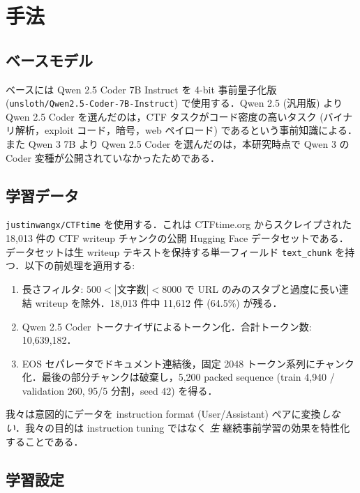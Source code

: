 \documentclass[10pt,twocolumn,a4paper]{ltjsarticle}
\begin{document}
\section{手法}

\subsection{ベースモデル}

ベースには Qwen 2.5 Coder 7B Instruct \cite{hui2024qwen25coder} を 4-bit 事前量子化版 (\texttt{unsloth/Qwen2.5-Coder-7B-Instruct}) で使用する．Qwen 2.5 (汎用版) より Qwen 2.5 Coder を選んだのは，CTF タスクがコード密度の高いタスク (バイナリ解析，exploit コード，暗号，web ペイロード) であるという事前知識による．また Qwen 3 7B より Qwen 2.5 Coder を選んだのは，本研究時点で Qwen 3 の Coder 変種が公開されていなかったためである．

\subsection{学習データ}

\texttt{justinwangx/CTFtime} \cite{justinwangx2024ctftime} を使用する．これは CTFtime.org からスクレイプされた 18{,}013 件の CTF writeup チャンクの公開 Hugging Face データセットである．データセットは生 writeup テキストを保持する単一フィールド \texttt{text\_chunk} を持つ．以下の前処理を適用する:

\begin{enumerate}
\item 長さフィルタ: $500 < |\text{文字数}| < 8000$ で URL のみのスタブと過度に長い連結 writeup を除外．18{,}013 件中 11{,}612 件 (64.5\%) が残る．
\item Qwen 2.5 Coder トークナイザによるトークン化．合計トークン数: 10{,}639{,}182．
\item EOS セパレータでドキュメント連結後，固定 2048 トークン系列にチャンク化．最後の部分チャンクは破棄し，5{,}200 packed sequence (train 4{,}940 / validation 260, 95/5 分割，seed 42) を得る．
\end{enumerate}

我々は意図的にデータを instruction format (User/Assistant) ペアに変換\emph{しない}．我々の目的は instruction tuning ではなく \emph{生} 継続事前学習の効果を特性化することである．

\subsection{学習設定}
\end{document}
